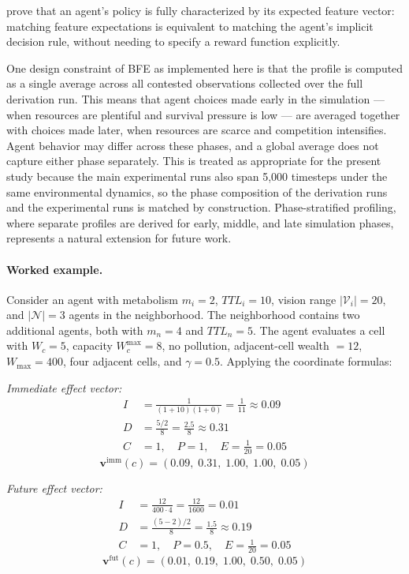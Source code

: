 \documentclass{icsthesis}
\begin{document}
\begin{mainmatter}
\citet{AbbeelNg2004} prove that an agent’s policy is fully characterized by its expected feature vector: matching feature expectations is equivalent to matching the agent’s implicit decision rule, without needing to specify a reward function explicitly.

One design constraint of BFE as implemented here is that the profile is computed as a single average across all contested observations collected over the full derivation run. This means that agent choices made early in the simulation --- when resources are plentiful and survival pressure is low --- are averaged together with choices made later, when resources are scarce and competition intensifies. Agent behavior may differ across these phases, and a global average does not capture either phase separately. This is treated as appropriate for the present study because the main experimental runs also span 5,000 timesteps under the same environmental dynamics, so the phase composition of the derivation runs and the experimental runs is matched by construction. Phase-stratified profiling, where separate profiles are derived for early, middle, and late simulation phases, represents a natural extension for future work.

\paragraph{Worked example.}
Consider an agent with metabolism $m_i = 2$, $TTL_i = 10$, vision range $|\mathcal{V}_i| = 20$, and $|\mathcal{N}| = 3$ agents in the neighborhood. The neighborhood contains two additional agents, both with $m_n = 4$ and $TTL_n = 5$. The agent evaluates a cell with $W_c = 5$, capacity $W_c^{\max} = 8$, no pollution, adjacent-cell wealth $= 12$, $W_{\max} = 400$, four adjacent cells, and $\gamma = 0.5$. Applying the coordinate formulas:

\noindent\textit{Immediate effect vector:}
\begin{align*}
I &= \tfrac{1}{(1+10)(1+0)} = \tfrac{1}{11} \approx 0.09 \\
D &= \tfrac{5/2}{8} = \tfrac{2.5}{8} \approx 0.31 \\
C &= 1,\quad P = 1,\quad E = \tfrac{1}{20} = 0.05
\end{align*}
\[
\mathbf{v}^{\mathrm{imm}}(c) = (0.09,\; 0.31,\; 1.00,\; 1.00,\; 0.05)
\]

\noindent\textit{Future effect vector:}
\begin{align*}
I &= \tfrac{12}{400 \cdot 4} = \tfrac{12}{1600} = 0.01 \\
D &= \tfrac{(5-2)/2}{8} = \tfrac{1.5}{8} \approx 0.19 \\
C &= 1,\quad P = 0.5,\quad E = \tfrac{1}{20} = 0.05
\end{align*}
\[
\mathbf{v}^{\mathrm{fut}}(c) = (0.01,\; 0.19,\; 1.00,\; 0.50,\; 0.05)
\]


\end{mainmatter}
\end{document}
